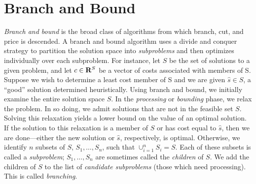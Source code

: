 
\section{Branch and Bound}

{\em Branch and bound} is the broad class of algorithms from which
branch, cut, and price is descended. A branch and bound algorithm uses
a divide and conquer strategy to partition the solution space into
{\em subproblems} and then optimizes individually over each
subproblem. For instance, let $S$ be the set of solutions to a given
problem, and let $c \in {\bf R}^S$ be a vector of costs associated
with members of S. Suppose we wish to determine a least cost member of
S and we are given $\hat{s} \in S$, a ``good'' solution determined
heuristically. Using branch and bound, we initially examine the entire
solution space $S$. In the {\em processing} or {\em bounding} phase,
we relax the problem. In so doing, we admit solutions that are not in
the feasible set $S$. Solving this relaxation yields a lower bound on
the value of an optimal solution. If the solution to this relaxation
is a member of $S$ or has cost equal to $\hat{s}$, then we are
done---either the new solution or $\hat{s}$, respectively, is optimal.
Otherwise, we identify $n$ subsets of $S$, $S_1, \ldots, S_n$, such
that $\cup_{i = 1}^n S_i = S$. Each of these subsets is called a {\em
subproblem}; $S_1, \ldots, S_n$ are sometimes called the {\em
children} of $S$. We add the children of $S$ to the list of {\em
candidate subproblems} (those which need processing). This is called
{\em branching}.

